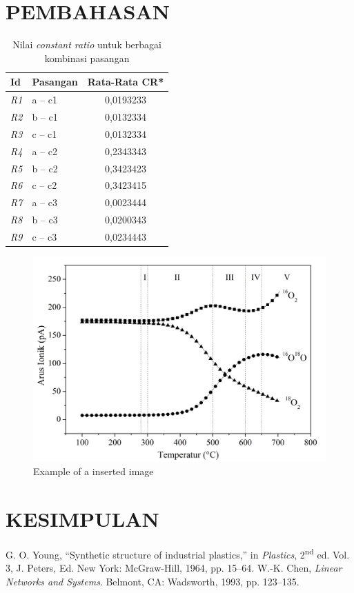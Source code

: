 \documentclass[12pt,a4paper]{article}
\begin{document}
\begin{multicols}{2}
\section{PEMBAHASAN}
\begin{table}[H]
  \centering
  \caption{Nilai \textit{constant ratio} untuk berbagai kombinasi pasangan}
  \label{tab:cr}
  \begin{tabular}{l l c}
  \toprule
  \textbf{Id} & \textbf{Pasangan} & \textbf{Rata-Rata CR*} \\
  \midrule
  \textit{R1} & a -- c1 & 0,0193233 \\
  \textit{R2} & b -- c1 & 0,0132334 \\
  \textit{R3} & c -- c1 & 0,0132334 \\
  \textit{R4} & a -- c2 & 0,2343343 \\
  \textit{R5} & b -- c2 & 0,3423423 \\
  \textit{R6} & c -- c2 & 0,3423415 \\
  \textit{R7} & a -- c3 & 0,0023444 \\
  \textit{R8} & b -- c3 & 0,0200343 \\
  \textit{R9} & c -- c3 & 0,0234443 \\
  \bottomrule
  \end{tabular}
  \end{table}
\lipsum
\begin{figure}[H]
  \centering
  \includegraphics[width=0.7\linewidth]{fig1.png}
  \caption{Example of a inserted image}
  \label{fig:example}
\end{figure}
\section{KESIMPULAN}
\lipsum
\begin{thebibliography}{99}
G. O. Young, ``Synthetic structure of industrial plastics,'' in \textit{Plastics}, 2\textsuperscript{nd} ed. Vol. 3, J. Peters, Ed. New York: McGraw-Hill, 1964, pp. 15--64.
W.-K. Chen, \textit{Linear Networks and Systems}. Belmont, CA: Wadsworth, 1993, pp. 123--135.
\end{thebibliography}

\end{multicols}
\end{document}
